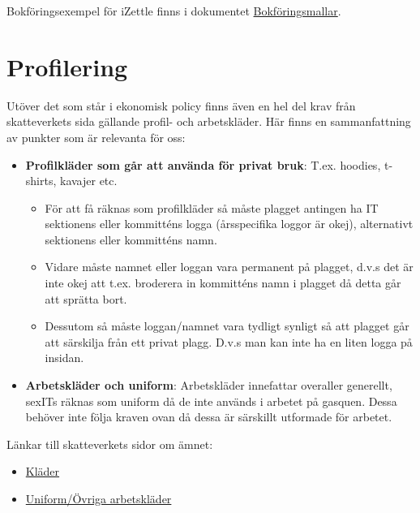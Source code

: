 \documentclass{article}
\begin{document}
Bokföringsexempel för iZettle finns i dokumentet \href{https://styrit.chalmers.it/wp-content/uploads/bokforingsmall.pdf}{Bokföringsmallar}. 


\section{Profilering}
Utöver det som står i ekonomisk policy finns även en hel del krav från skatteverkets sida gällande profil- och arbetskläder. Här finns en sammanfattning av punkter som är relevanta för oss:
\begin{itemize}
    \item \textbf{Profilkläder som går att använda för privat bruk}: T.ex. hoodies, t-shirts, kavajer etc.
    \begin{itemize}
        \item För att få räknas som profilkläder så måste plagget antingen ha IT sektionens eller kommitténs logga (årsspecifika loggor är okej), alternativt sektionens eller kommitténs namn.
        \item Vidare måste namnet eller loggan vara permanent på plagget, d.v.s det är inte okej att t.ex. broderera in kommitténs namn i plagget då detta går att sprätta bort.
        \item Dessutom så måste loggan/namnet vara tydligt synligt så att plagget går att särskilja från ett privat plagg. D.v.s man kan inte ha en liten logga på insidan.
    \end{itemize}
    \item \textbf{Arbetskläder och uniform}: Arbetskläder innefattar overaller generellt, sexITs räknas som uniform då de inte används i arbetet på gasquen. Dessa behöver inte följa kraven ovan då dessa är särskillt utformade för arbetet.
\end{itemize}

Länkar till skatteverkets sidor om ämnet:
\begin{itemize}
    \item \href{https://www4.skatteverket.se/rattsligvagledning/324001.html}{Kläder}
    \item \href{https://www.skatteverket.se/privat/skatter/arbeteochinkomst/formaner/arbetsklader.4.7459477810df5bccdd480008466.html}{Uniform/Övriga arbetskläder}
\end{itemize}
\end{document}
